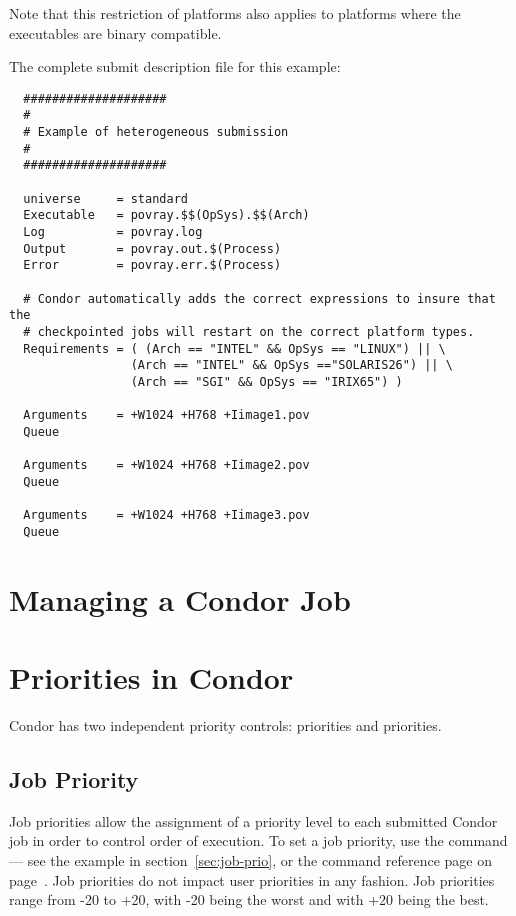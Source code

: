 Note that this restriction of platforms also applies to platforms where
the executables are binary compatible.

The complete submit description file for this example:

\begin{verbatim}
  ####################
  #
  # Example of heterogeneous submission
  #
  ####################

  universe     = standard
  Executable   = povray.$$(OpSys).$$(Arch)
  Log          = povray.log
  Output       = povray.out.$(Process)
  Error        = povray.err.$(Process)

  # Condor automatically adds the correct expressions to insure that the
  # checkpointed jobs will restart on the correct platform types.
  Requirements = ( (Arch == "INTEL" && OpSys == "LINUX") || \
                 (Arch == "INTEL" && OpSys =="SOLARIS26") || \
                 (Arch == "SGI" && OpSys == "IRIX65") )

  Arguments    = +W1024 +H768 +Iimage1.pov
  Queue 

  Arguments    = +W1024 +H768 +Iimage2.pov
  Queue 

  Arguments    = +W1024 +H768 +Iimage3.pov
  Queue 
\end{verbatim}

\section{Managing a Condor Job}


\section{\label{sec:Priorities}Priorities in Condor}

Condor has two independent priority controls: 
priorities and  priorities.  

\subsection{Job Priority}

Job priorities allow the assignment of a priority level to
each submitted Condor job in order to
control order of execution.
To set a job priority, use the  command
--- see the example in section~\ref{sec:job-prio}, or the
command reference page on page~\pageref{man-condor-prio}.
Job priorities do not impact user priorities in any fashion.
Job priorities range from -20 to +20,
with -20 being the worst and with +20 being the best.

